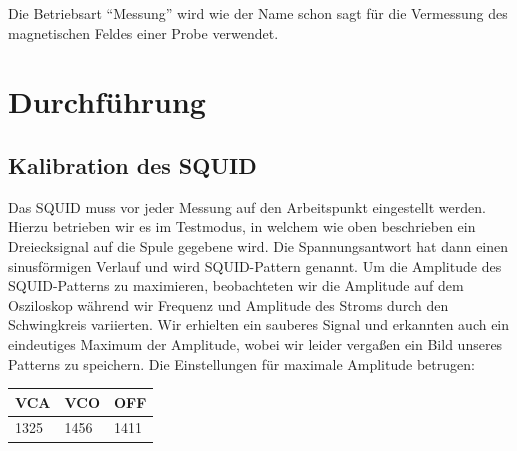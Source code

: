 \documentclass[12pt]{article}
\begin{document}
Die Betriebsart "`Messung"' wird wie der Name schon sagt für die Vermessung des magnetischen Feldes einer Probe verwendet.

\section{Durchführung}
\subsection{Kalibration des SQUID}
Das SQUID muss vor jeder Messung auf den Arbeitspunkt eingestellt werden. Hierzu betrieben wir es im Testmodus, in welchem wie oben beschrieben ein Dreiecksignal auf die Spule gegebene wird. Die Spannungsantwort hat dann einen sinusförmigen Verlauf und wird SQUID-Pattern genannt. Um die Amplitude des SQUID-Patterns zu maximieren, beobachteten wir die Amplitude auf dem Osziloskop während wir Frequenz und Amplitude des Stroms durch den Schwingkreis variierten. Wir erhielten ein sauberes Signal und erkannten auch ein eindeutiges Maximum der Amplitude, wobei wir leider vergaßen ein Bild unseres Patterns zu speichern. Die Einstellungen für maximale Amplitude betrugen:
\begin{center}
\begin{tabular}{|l|l|l|}
\hline
VCA & VCO & OFF \\ 
\hline
1325 & 1456 & 1411 \\ 
\hline
\end{tabular}
\end{center}
\end{document}
